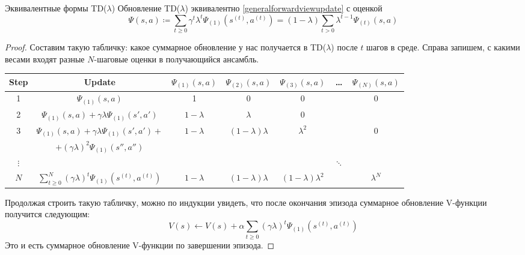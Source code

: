 \begin{theoremBox}[label=th:tdlambda]{Эквивалентные формы TD($\lambda$)}
Обновление TD($\lambda$) эквивалентно \eqref{generalforwardviewupdate} с оценкой
\begin{equation}\label{TDlambda} 
\Psi(s, a) \coloneqq \sum_{t \ge 0} \gamma^t \lambda^t \Psi_{(1)}(s^{(t)}, a^{(t)}) = (1 - \lambda) \sum_{t > 0} \lambda^{t-1} \Psi_{(t)}(s, a)
\end{equation}
\begin{proof}
Составим такую табличку: какое суммарное обновление у нас получается в TD($\lambda$) после $t$ шагов в среде. Справа запишем, с какими весами входят разные $N$-шаговые оценки в получающийся ансамбль.
\begin{center}
\begin{tabular}{|c|c||c|c|c|c|c|}
\hline
\small \textbf{Step} & \small \textbf{Update} & \small \textbf{$\Psi_{(1)}(s, a)$} & \small \textbf{$\Psi_{(2)}(s, a)$} &
\textbf{$\Psi_{(3)}(s, a)$} & 
\textbf{ \dots } & \small \textbf{$\Psi_{(N)}(s, a)$}\\
\hline
1 & $\Psi_{(1)}(s, a)$ &
1 & 0 & 0 & & 0 \\
\hline
2 & $\Psi_{(1)}(s, a) + \gamma \lambda \Psi_{(1)}(s', a')$ &
$1 - \lambda$ & $\lambda$ & 0 & & \\
\hline
\multirow{2}{*}{3} & $\Psi_{(1)}(s, a) + \gamma \lambda \Psi_{(1)}(s', a') +$ &
\multirow{2}{*}{$1 - \lambda$} & \multirow{2}{*}{$(1 - \lambda)\lambda$} & \multirow{2}{*}{$\lambda^2$} & & \multirow{2}{*}{0} \\
& $+ (\gamma \lambda)^2 \Psi_{(1)}(s'', a'')$ &
 & & & &  \\
\hline
$\vdots$ & & & & &  $\ddots$ & \\
\hline
$N$ & $\sum^N_{t \ge 0} (\gamma \lambda)^t \Psi_{(1)}(s^{(t)}, a^{(t)})$ &
$1 - \lambda$ & $(1 - \lambda)\lambda$ & $(1 - \lambda)\lambda^2$ & & $\lambda^N$ \\
\hline
\end{tabular}
\end{center}

Продолжая строить такую табличку, можно по индукции увидеть, что после окончания эпизода суммарное обновление V-функции получится следующим:
$$V(s) \leftarrow V(s) + \alpha \sum_{t \ge 0} (\gamma \lambda)^t \Psi_{(1)}(s^{(t)}, a^{(t)})$$
Это и есть суммарное обновление V-функции по завершении эпизода.
\end{proof}


\end{theoremBox}
